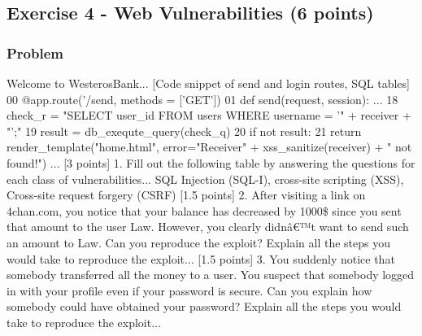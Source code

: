 \documentclass{article}
\begin{document}
\subsection{Exercise 4 - Web Vulnerabilities (6 points)}
\subsubsection*{Problem}
Welcome to WesterosBank...
[Code snippet of send and login routes, SQL tables]
00 @app.route('/send, methods = ['GET'])
01 def send(request, session):
...
18 check\_r = "SELECT user\_id FROM users WHERE username = '" + receiver + "';"
19 result = db\_exequte\_query(check\_q)
20 if not result:
21 return render\_template("home.html", error="Receiver" + xss\_sanitize(receiver) + " not found!")
...
[3 points] 1. Fill out the following table by answering the questions for each class of vulnerabilities... SQL Injection (SQL-I), cross-site scripting (XSS), Cross-site request forgery (CSRF)
[1.5 points] 2. After visiting a link on 4chan.com, you notice that your balance has decreased by 1000\$ since you sent that amount to the user Law. However, you clearly didnâ€™t want to send such an amount to Law. Can you reproduce the exploit? Explain all the steps you would take to reproduce the exploit...
[1.5 points] 3. You suddenly notice that somebody transferred all the money to a user. You suspect that somebody logged in with your profile even if your password is secure. Can you explain how somebody could have obtained your password? Explain all the steps you would take to reproduce the exploit...
\end{document}

